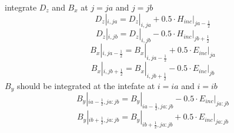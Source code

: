 integrate $D_z$ and $B_x$ at $j=ja$ and $j=jb$
\begin{displaymath}
  D_z|_{i,ja} = D_z|_{i,ja} + 0.5 \cdot H_{inc}|_{ja-\frac{1}{2}}
\end{displaymath}
\begin{displaymath}
  D_z|_{i,jb} = D_z|_{i,jb} - 0.5 \cdot H_{inc}|_{jb+\frac{1}{2}}  
\end{displaymath}
\begin{displaymath}
  B_x|_{i,ja-\frac{1}{2}}=B_x|_{i,ja-\frac{1}{2}}+0.5 \cdot E_{inc}|_{ja}
\end{displaymath}
\begin{displaymath}
  B_x|_{i,jb+\frac{1}{2}}=B_x|_{i,jb+\frac{1}{2}}-0.5 \cdot E_{inc}|_{jb}
\end{displaymath}
$B_y$ should be integrated at the intefate at $i=ia$ and $i=ib$
\begin{displaymath}
  B_y|_{ia-\frac{1}{2},ja:jb}=B_y|_{ia-\frac{1}{2},ja:jb}-0.5 \cdot E_{inc}|_{ja:jb}
\end{displaymath}
\begin{displaymath}
  B_y|_{ib+\frac{1}{2},ja:jb}=B_y|_{ib+\frac{1}{2},ja:jb}+0.5 \cdot E_{inc}|_{ja:jb}
\end{displaymath}






